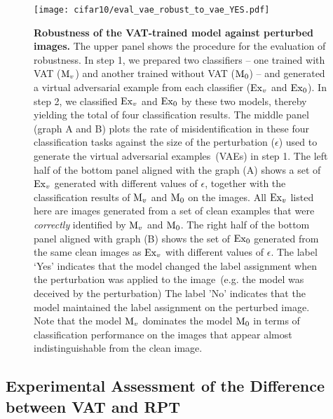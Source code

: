 \documentclass[10pt,journal,compsoc]{IEEEtran}
\begin{document}
\begin{figure}
	\centering   
    	\texttt{[image: cifar10/eval\_vae\_robust\_to\_vae\_YES.pdf]}
		\caption{\label{fig:misid}\textbf{Robustness of the VAT-trained model against perturbed images.}  
        The upper panel shows the procedure for the evaluation of robustness.  
        In step 1, we prepared two classifiers -- one trained with VAT (${\rm M}_v$)  and another trained without VAT (${\rm M}_0$) -- and generated a virtual adversarial example from each classifier (${\rm Ex}_v$ and ${\rm Ex}_0$). In step 2, we classified ${\rm Ex}_v$ and ${\rm Ex}_0$ by these two models, thereby yielding the total of four classification results. 
    	The middle panel (graph A and B) plots the rate of misidentification  in these four classification tasks against the size of the perturbation ($\epsilon$) used to generate the virtual adversarial examples~(VAEs) in step 1. 
        The left half of the bottom panel aligned with the graph (A) shows a set of ${\rm Ex}_v$ generated with different values of $\epsilon$, together with the classification results of ${\rm M}_v$ and ${\rm M}_0$ on the images. 
        All ${\rm Ex}_v$ listed here are images generated from a set of clean examples that were \textit{correctly} identified by ${\rm M}_v$ and ${\rm M}_0$. 
        The right half of the bottom panel aligned with graph (B) shows the set of ${\rm Ex}_0$ generated from the same clean images as ${\rm Ex}_v$ with different values of $\epsilon$. 
        The label `Yes' indicates that the model changed the label assignment when the perturbation was applied to the image~(e.g. the model was deceived by the perturbation)
        The label 'No' indicates that the model maintained the label assignment on the perturbed image.
		Note that the model ${\rm M}_v$ dominates the model ${\rm M}_0$ in terms of classification performance on the images that appear almost indistinguishable from the clean image. }
\end{figure}

\subsection{\label{subsec:VATvsRPT}Experimental Assessment of the Difference between VAT and RPT }
\end{document}
